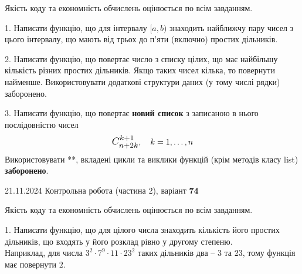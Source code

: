 \documentclass[12pt, ukrainian]{article}
\begin{document}
{{{{{{{{{{{{{{
\begin {large}
Якість коду та економність обчислень оцінюється по всім завданням.

\vspace{5mm}

1. Написати функцію, що для інтервалу $[a, b)$ знаходить найближчу пару чисел з цього інтервалу, що мають від трьох до п'яти (включно) простих дільників.

\vspace{10mm}


2. Написати функцію, що повертає число з списку цілих, що має найбільшу кількість різних простих дільників. Якщо таких чисел кілька, то повернути найменше. Використовувати додаткові структури даних (у тому числі рядки) заборонено.

\vspace{10mm}


3. 
Написати функцію, що повертає \textbf{новий список} з записаною в нього послідовністю чисел
$$\scalebox{1.2}{$C_{n+2k}^{k+1}$}, \quad k=1,\ldots,n$$
Використовувати **, вкладені цикли та виклики функцій (крім методів класу list) \textbf{заборонено}.

\end{large}
\newpage
{{21.11.2024 Контрольна робота  (частина 2), варіант  \No \textbf { 74 }\par}}


{
\begin {large}
Якість коду та економність обчислень оцінюється по всім завданням.

\vspace{5mm}

1. Написати функцію, що для цілого числа знаходить кількість його простих дільників, що входять у його розклад рівно у другому степеню. \\ Наприклад, для числа $3^2{\cdot}7^9{\cdot}11{\cdot}23^{2}$ таких дільників два – $3$ та $23$, тому функція має повернути $2$.

\vspace{10mm}


\end{large}}}}}}}}}}}}}}}}
\end{document}
